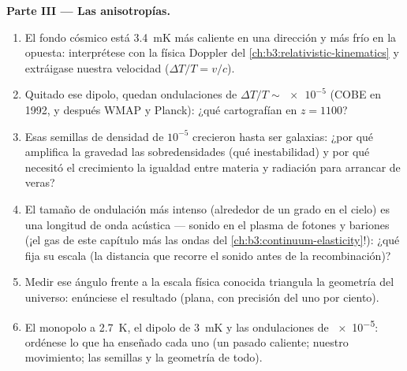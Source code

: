 \begin{problem}
\medskip\noindent\textbf{Parte III --- Las anisotropías.}
\begin{enumerate}[resume]
  \item El fondo cósmico está \qty{3.4}{mK} más caliente en una dirección y
        más frío en la opuesta: interprétese con la física Doppler del
        \cref{ch:b3:relativistic-kinematics} y extráigase nuestra
        velocidad ($\Delta T/T = v/c$).
  \item Quitado ese dipolo, quedan ondulaciones de $\Delta T/T \sim
        \num{e-5}$ (COBE en 1992, y después WMAP y Planck): ¿qué
        cartografían en $z = 1100$?
  \item Esas semillas de densidad de $10^{-5}$ crecieron hasta ser galaxias: ¿por qué
        amplifica la gravedad las sobredensidades (qué inestabilidad)
        y por qué necesitó el crecimiento la igualdad entre materia y radiación
        para arrancar de veras?
  \item El tamaño de ondulación más intenso (alrededor de un grado en el cielo)
        es una longitud de onda acústica --- sonido en el
        plasma de fotones y bariones (¡el gas de este capítulo más
        las ondas del \cref{ch:b3:continuum-elasticity}!): ¿qué fija
        su escala (la distancia que recorre el sonido antes de la
        recombinación)?
  \item Medir ese ángulo frente a la escala física conocida
        triangula la geometría del universo: enúnciese el
        resultado (plana, con precisión del uno por ciento).
  \item El monopolo a \qty{2.7}{K}, el dipolo de \qty{3}{mK} y las
        ondulaciones de \num{e-5}: ordénese lo que ha enseñado cada uno (un pasado
        caliente; nuestro movimiento; las semillas y la geometría de todo).
\end{enumerate}


\end{problem}
